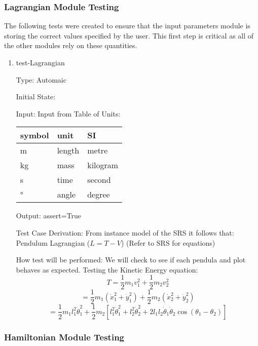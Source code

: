 \documentclass[12pt, titlepage]{article}
\begin{document}
\subsubsection{\progname Lagrangian Module Testing}

The following tests were created to ensure that the input parameters module is 
storing the correct values specified by the user. This first step is critical 
as all of the other modules rely on these quantities.

\begin{enumerate}				
	\item{test-Lagrangian\\}
	
	Type: Automaic
	
	Initial State: 
	
	Input: Input from Table of Units:\\
  \noindent \begin{tabular}{l l l} 
    \toprule		
    \textbf{symbol} & \textbf{unit} & \textbf{SI}\\
    \midrule 
    \si{\metre} & length & metre\\
    \si{\kilogram} & mass & kilogram\\
    \si{\second} & time & second\\
    \si{\degree} & angle & degree\\
    \bottomrule
  \end{tabular}
	
	Output: assert=True
	
	Test Case Derivation: From instance model of the SRS it follows that:
	Pendulum Lagrangian ($L=T-V$)
	(Refer to SRS for equations)
	
	How test will be performed: We will check to see if each pendula and plot behaves as expected.
	Testing the Kinetic Energy equation:
	$$ T = \displaystyle\frac{1}{2}m_1v_1^2 + \frac{1}{2}m_2v_2^2 $$
$$ = \frac{1}{2}m_1(\dot{x}_1^2 + \dot{y}_1^2) + \frac{1}{2}m_2(\dot{x}_2^2 +
\dot{y}_2^2) $$
$$ = \frac{1}{2}m_1 l_1^2 \dot{\theta}_1^2 + \frac{1}{2}m_2\left[l_1^2
\dot{\theta}_1^2 + l_2^2 \dot{\theta}_2^2 + 2l_1l_2\dot{\theta}_1\dot{\theta}_2
\cos(\theta_1 - \theta_2)\right]$$
			
\end{enumerate} 

\subsubsection{\progname Hamiltonian Module Testing}
\end{document}
